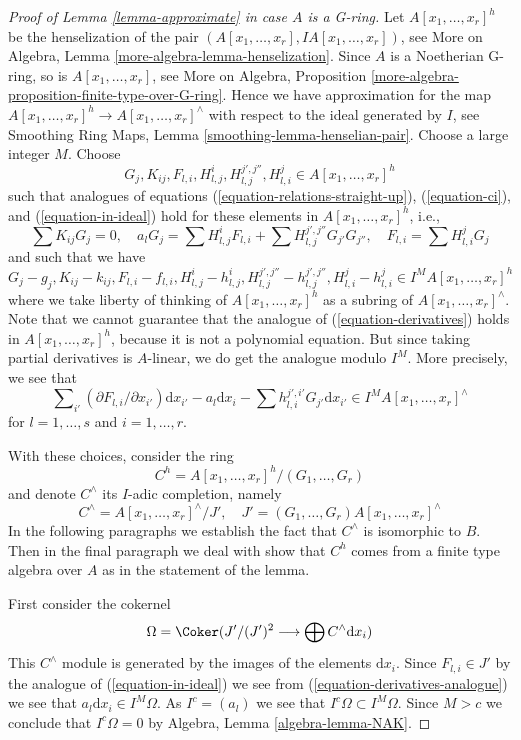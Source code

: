 \begin{proof}[Proof of Lemma \ref{lemma-approximate} in case $A$ is a G-ring]
\medskip\noindent
Let $A[x_1, \ldots, x_r]^h$ be the henselization of the
pair $(A[x_1, \ldots, x_r], IA[x_1, \ldots, x_r])$, see
More on Algebra, Lemma \ref{more-algebra-lemma-henselization}.
Since $A$ is a Noetherian G-ring, so is $A[x_1, \ldots, x_r]$, see
More on Algebra, Proposition
\ref{more-algebra-proposition-finite-type-over-G-ring}.
Hence we have approximation for the map
$A[x_1, \ldots, x_r]^h \to A[x_1, \ldots, x_r]^\wedge$
with respect to the ideal generated by $I$, see
Smoothing Ring Maps, Lemma \ref{smoothing-lemma-henselian-pair}.
Choose a large integer $M$. Choose
$$
G_j, K_{ij}, F_{l, i}, H_{l, j}^i, H_{l, j}^{j', j''}, H_{l, i}^j
\in A[x_1, \ldots, x_r]^h
$$
such that analogues of equations (\ref{equation-relations-straight-up}),
(\ref{equation-ci}), and (\ref{equation-in-ideal})
hold for these elements in $A[x_1, \ldots, x_r]^h$, i.e.,
$$
\sum K_{ij}G_j = 0,\quad
a_l G_j = \sum H_{l, j}^iF_{l, i} +
\sum H_{l, j}^{j', j''} G_{j'} G_{j''},\quad
F_{l, i} = \sum H_{l, i}^j G_j
$$
and such that we have
$$
G_j - g_j, K_{ij} - k_{ij}, F_{l, i} - f_{l, i},
H_{l, j}^i - h_{l, j}^i, H_{l, j}^{j', j''} - h_{l, j}^{j', j''},
H_{l, i}^j - h_{l, i}^j
\in I^M A[x_1, \ldots, x_r]^h
$$
where we take liberty of thinking of $A[x_1, \ldots, x_r]^h$ as a
subring of $A[x_1, \ldots, x_r]^\wedge$.
Note that we cannot guarantee that the analogue of
(\ref{equation-derivatives}) holds
in $A[x_1, \ldots, x_r]^h$, because it is not a polynomial equation.
But since taking partial derivatives is $A$-linear, we do get
the analogue modulo $I^M$. More precisely, we see that
\begin{equation}
\label{equation-derivatives-analogue}
\sum\nolimits_{i'} (\partial F_{l, i}/ \partial x_{i'}) \text{d}x_{i'}
- a_l \text{d}x_i - \sum h_{l, i}^{j', i'} G_{j'} \text{d}x_{i'}
\in I^MA[x_1, \ldots, x_r]^\wedge
\end{equation}
for $l = 1, \ldots, s$ and $i = 1, \ldots, r$.

\medskip\noindent
With these choices, consider the ring
$$
C^h = A[x_1, \ldots, x_r]^h/(G_1, \ldots, G_r)
$$
and denote $C^\wedge$ its $I$-adic completion, namely
$$
C^\wedge = A[x_1, \ldots, x_r]^\wedge/J',\quad
J' = (G_1, \ldots, G_r)A[x_1, \ldots, x_r]^\wedge
$$
In the following paragraphs we establish the fact that $C^\wedge$
is isomorphic to $B$. Then in the final paragraph we deal with
show that $C^h$ comes from a finite type algebra
over $A$ as in the statement of the lemma.

\medskip\noindent
First consider the cokernel
$$
\Omega = \Coker(J'/(J')^2 \longrightarrow \bigoplus C^\wedge \text{d}x_i)
$$
This $C^\wedge$ module is generated by the images of the elements
$\text{d}x_i$. Since $F_{l, i} \in J'$ by the analogue of
(\ref{equation-in-ideal}) we see from
(\ref{equation-derivatives-analogue}) we see
that $a_l \text{d}x_i \in I^M\Omega$. As $I^c = (a_l)$ we see that
$I^c \Omega \subset I^M \Omega$. Since $M > c$ we conclude that
$I^c \Omega = 0$ by Algebra, Lemma \ref{algebra-lemma-NAK}.


\end{proof}
